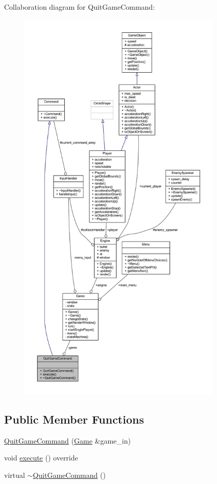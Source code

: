 Collaboration diagram for Quit\+Game\+Command\+:
\nopagebreak
\begin{figure}[H]
\begin{center}
\leavevmode
\includegraphics[height=550pt]{class_quit_game_command__coll__graph}
\end{center}
\end{figure}
\subsection*{Public Member Functions}
\begin{DoxyCompactItemize}
\item 
\hyperlink{class_quit_game_command_ae05171411d2210b38bd6ee08e2d90f15}{Quit\+Game\+Command} (\hyperlink{class_game}{Game} \&game\+\_\+in)
\item 
void \hyperlink{class_quit_game_command_ad39d43150a927d7e8b0dd7162eb840eb}{execute} () override
\item 
virtual \hyperlink{class_quit_game_command_af19303e2bf11dcd6f65359b4f9608540}{$\sim$\+Quit\+Game\+Command} ()
\end{DoxyCompactItemize}
